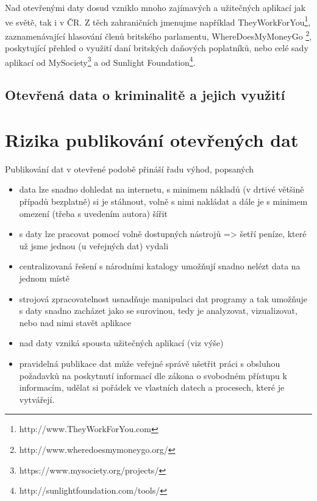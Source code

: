 Nad otevřenými daty dosud vzniklo mnoho zajímavých a užitečných aplikací jak ve světě, tak i v ČR. Z těch zahraničních jmenujme například TheyWorkForYou\footnote{http://www.TheyWorkForYou.com}, zaznamenávající hlasování členů britského parlamentu, WhereDoesMyMoneyGo \footnote{http://www.wheredoesmymoneygo.org/}, poskytující přehled o využití daní britských daňových poplatníků, nebo celé sady aplikací od MySociety\footnote{https://www.mysociety.org/projects/} a od Sunlight Foundation\footnote{http://sunlightfoundation.com/tools/}.

\subsection{Otevřená data o kriminalitě a jejich využití}



\section{Rizika publikování otevřených dat}

Publikování dat v otevřené podobě přináší řadu výhod, popsaných 
\begin{itemize}
	\item data lze snadno dohledat na internetu, s minimem nákladů (v drtivé většině případů bezplatně) si je stáhnout, volně s nimi nakládat a dále je s minimem omezení (třeba s uvedením autora) šířit
	\item s daty lze pracovat pomocí volně dostupných nástrojů => šetří peníze, které už jsme jednou (u veřejných dat) vydali
	\item centralizovaná řešení s národními katalogy umožňují snadno nelézt data na jednom místě
	\item strojová zpracovatelnost usnadňuje manipulaci dat programy a tak umožňuje s daty snadno zacházet jako se surovinou, tedy je analyzovat, vizualizovat, nebo nad nimi stavět aplikace
	\item nad daty vzniká spousta užitečných aplikací (viz výše)
	\item pravidelná publikace dat může veřejné správě ušetřit práci s obsluhou požadavků na poskytnutí informací dle zákona o svobodném přístupu k informacím, udělat si pořádek ve vlastních datech a procesech, které je vytvářejí.
\end{itemize}

